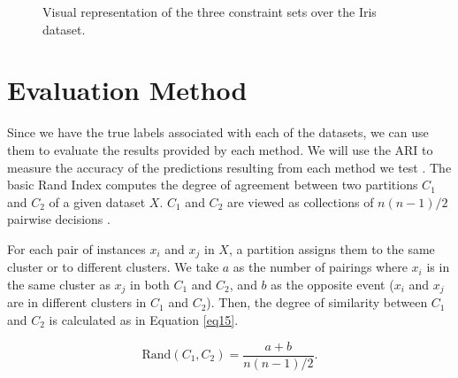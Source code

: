 \begin{figure}[bth]
	\caption{Visual representation of the three constraint sets over the Iris dataset.}
	\label{fig:IrisConst}
\end{figure}

\section{Evaluation Method} \label{sec:EvalMet}

Since we have the true labels associated with each of the datasets, we can use them to evaluate the results provided by each method. We will use the \acf{ARI} to measure the accuracy of the predictions resulting from each method we test \cite{hubert1985comparing}. The basic Rand Index computes the degree of agreement between two partitions $C_1$ and $C_2$ of a given dataset $X$. $C_1$ and $C_2$ are viewed as collections of $n(n - 1)/2$ pairwise decisions \cite{rand1971objective}.

For each pair of instances $x_i$ and $x_j$ in $X$, a partition assigns them to the same cluster or to different clusters. We take $a$ as the number of pairings where $x_i$ is in the same cluster as $x_j$ in both $C_1$ and $C_2$, and $b$ as the opposite event ($x_i$ and $x_j$ are in different clusters in $C_1$ and $C_2$). Then, the degree of similarity between $C_1$ and $C_2$ is calculated as in Equation \eqref{eq15}.

\begin{equation}
\text{Rand}(C_1, C_2) = \frac{a + b}{n(n - 1)/2}.
\label{eq15}
\end{equation}

